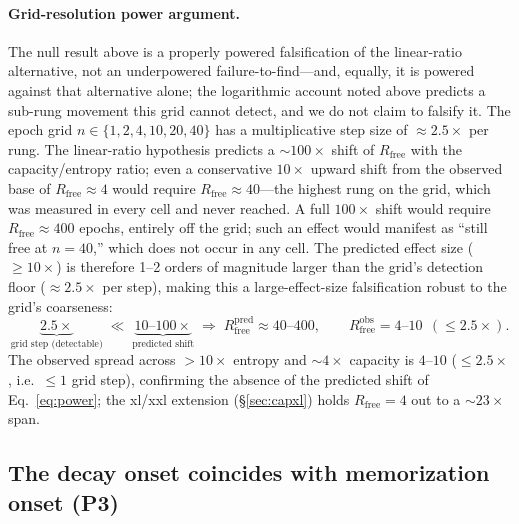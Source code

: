 \documentclass[11pt]{article}
\begin{document}
\paragraph{Grid-resolution power argument.}\label{par:powerarg}
The null result above is a properly powered falsification of the linear-ratio
alternative, not an underpowered failure-to-find---and, equally, it is powered against
that alternative alone; the logarithmic account noted above predicts a
sub-rung movement this grid cannot detect, and we do not claim to falsify it. The epoch
grid $n \in \{1, 2, 4, 10, 20, 40\}$ has a
multiplicative step size of $\approx 2.5\times$ per rung.  The linear-ratio hypothesis predicts
a $\sim 100\times$ shift of $R_{\mathrm{free}}$ with the capacity/entropy ratio; even a
conservative $10\times$ upward shift from the observed base of $R_{\mathrm{free}} \approx 4$
would require $R_{\mathrm{free}} \approx 40$---the highest rung on the grid, which was
measured in every cell and never reached.  A full $100\times$ shift would require
$R_{\mathrm{free}} \approx 400$ epochs, entirely off the grid; such an effect would
manifest as ``still free at $n = 40$,'' which does not occur in any cell.  The predicted
effect size ($\geq 10\times$) is therefore 1--2 orders of magnitude larger than the grid's
detection floor (${\approx}2.5\times$ per step), making this a large-effect-size
falsification robust to the grid's coarseness:
\begin{equation}
  \underbrace{2.5\times}_{\text{grid step (detectable)}}
  \;\ll\;
  \underbrace{10\text{--}100\times}_{\text{predicted shift}}
  \;\Longrightarrow\;
  R_{\mathrm{free}}^{\text{pred}} \approx 40\text{--}400,
  \qquad
  R_{\mathrm{free}}^{\text{obs}} = 4\text{--}10 \ \ ({\leq}2.5\times).
  \label{eq:power}
\end{equation}
The observed spread across $>10\times$
entropy and $\sim 4\times$ capacity is $4$--$10$ ($\leq 2.5\times$, i.e.\ $\leq 1$ grid
step), confirming the absence of the predicted shift of Eq.~\eqref{eq:power}; the xl/xxl extension
(\S\ref{sec:capxl}) holds $R_{\mathrm{free}}=4$ out to a ${\sim}23\times$ span.

\subsection{The decay onset coincides with memorization onset (P3)}\label{sec:p3}
\end{document}
